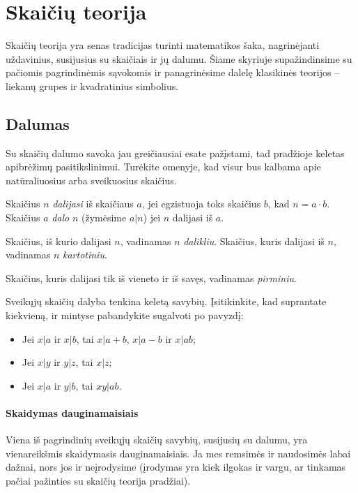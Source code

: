 \chapter{Skaičių teorija}
\thispagestyle{empty}

Skaičių teorija yra senas tradicijas turinti matematikos šaka, nagrinėjanti
uždavinius, susijusius su skaičiais ir jų dalumu. Šiame skyriuje
supažindinsime su pačiomis pagrindinėmis sąvokomis ir panagrinėsime dalelę
klasikinės teorijos -- liekanų grupes ir kvadratinius simbolius.

\section{Dalumas}

Su skaičių dalumo savoka jau greičiausiai esate pažįstami, tad pradžioje
keletas apibrėžimų pasitikslinimui. Turėkite omenyje, kad visur bus kalbama
apie natūraliuosius arba sveikuosius skaičius.

\begin{api} 
  Skaičius $n$ \emph{dalijasi} iš skaičiaus $a$, jei egzistuoja toks
  skaičius $b$, kad $n=a\cdot b$. Skaičius $a$ \emph{dalo} $n$ (žymėsime $a|n$)
  jei $n$ dalijasi iš $a$.  
\end{api}

\begin{api}
  Skaičius, iš kurio dalijasi $n$, vadinamas $n$ \emph{dalikliu}.
  Skaičius, kuris dalijasi iš $n$, vadinamas $n$ \emph{kartotiniu}.  
\end{api}

\begin{api} 
  Skaičius, kuris dalijasi tik iš vieneto ir iš savęs, vadinamas
  \emph{pirminiu}. 
\end{api}

Sveikųjų skaičių dalyba tenkina keletą savybių. Įsitikinkite, kad
suprantate kiekvieną, ir mintyse pabandykite sugalvoti po pavyzdį:

\begin{itemize} 
  \item Jei $x|a$ ir $x|b$, tai $x|a+b$, $x|a-b$ ir $x|ab$;
  \item Jei $x|y$ ir $y|z$, tai $x|z$; 
  \item Jei $x|a$ ir $y|b$, tai $xy|ab$.  
\end{itemize}

\subsubsection{Skaidymas dauginamaisiais}
Viena iš pagrindinių sveikųjų skaičių savybių, susijusių su dalumu, yra
vienareikšmis skaidymasis dauginamaisiais. Ja mes remsimės ir naudosimės
labai dažnai, nors jos ir neįrodysime (įrodymas yra kiek ilgokas ir vargu,
ar tinkamas pačiai pažinties su skaičių teorija pradžiai).

